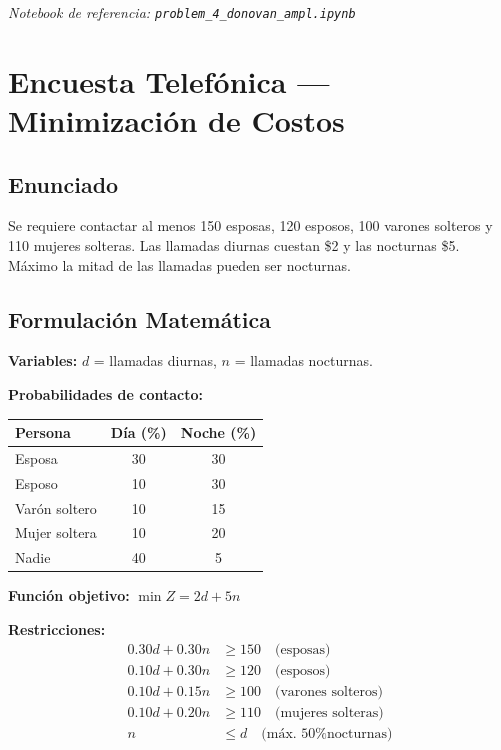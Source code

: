 \documentclass[12pt,a4paper]{article}
\begin{document}
\textit{Notebook de referencia: \texttt{problem\_4\_donovan\_ampl.ipynb}}

\newpage

\section{Encuesta Telefónica --- Minimización de Costos}

\subsection{Enunciado}

Se requiere contactar al menos 150 esposas, 120 esposos, 100 varones solteros y 110 mujeres solteras. Las llamadas diurnas cuestan \$2 y las nocturnas \$5. Máximo la mitad de las llamadas pueden ser nocturnas.

\subsection{Formulación Matemática}

\textbf{Variables:} $d$ = llamadas diurnas, $n$ = llamadas nocturnas.

\textbf{Probabilidades de contacto:}

\begin{table}[h]
\centering
\begin{tabular}{lcc}
\toprule
\textbf{Persona} & \textbf{Día (\%)} & \textbf{Noche (\%)} \\
\midrule
Esposa & 30 & 30 \\
Esposo & 10 & 30 \\
Varón soltero & 10 & 15 \\
Mujer soltera & 10 & 20 \\
Nadie & 40 & 5 \\
\bottomrule
\end{tabular}
\end{table}

\textbf{Función objetivo:} $\min Z = 2d + 5n$

\textbf{Restricciones:}
\begin{align}
0.30d + 0.30n &\geq 150 \quad \text{(esposas)} \\
0.10d + 0.30n &\geq 120 \quad \text{(esposos)} \\
0.10d + 0.15n &\geq 100 \quad \text{(varones solteros)} \\
0.10d + 0.20n &\geq 110 \quad \text{(mujeres solteras)} \\
n &\leq d \quad \text{(máx. 50\% nocturnas)}
\end{align}
\end{document}
